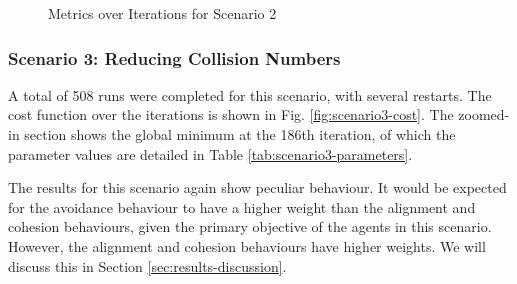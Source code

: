 \documentclass[12pt]{article}
\begin{document}
\begin{figure}[ht]
    \centering
    \caption{Metrics over Iterations for Scenario 2}
    \label{fig:scenario2-metrics}
\end{figure}

\subsubsection{Scenario 3: Reducing Collision Numbers}
A total of 508 runs were completed for this scenario, with several restarts. The cost function over the iterations is shown in Fig. \ref{fig:scenario3-cost}. The zoomed-in section shows the global minimum at the 186th iteration, of which the parameter values are detailed in Table \ref{tab:scenario3-parameters}.

The results for this scenario again show peculiar behaviour. It would be expected for the avoidance behaviour to have a higher weight than the alignment and cohesion behaviours, given the primary objective of the agents in this scenario. However, the alignment and cohesion behaviours have higher weights. We will discuss this in Section \ref{sec:results-discussion}.
\end{document}
